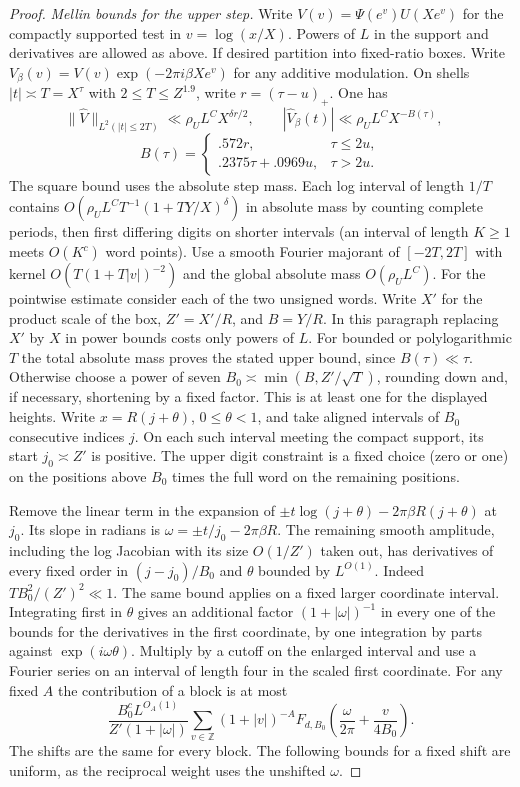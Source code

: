 \documentclass[11pt,a4paper]{article}
\theoremstyle{paperplain}
\numberwithin{equation}{section}
\begin{document}
\begin{proof}
\par\smallskip\noindent\textit{Mellin bounds for the upper step.}  Write \(V(v)=\Psi(e^v)U(Xe^v)\)
for the compactly supported test in \(v=\log(x/X)\). Powers of \(L\) in the support and
derivatives are allowed as above. If desired partition into fixed-ratio boxes. Write
\(V_\beta(v)=V(v)\exp(-2\pi i\beta Xe^v)\) for any additive modulation. On shells \(|t|\asymp
T=X^\tau\) with \(2\le T\le Z^{1.9}\), write \(r=(\tau-u)_+\). One has
\[
 \|\widehat V\|_{L^2(|t|\le2T)}\ll\rho_U L^C X^{\delta r/2},\qquad
 |\widehat V_\beta(t)|\ll \rho_U L^C X^{-B(\tau)},\quad\]
\[
 B(\tau)=\begin{cases}.572r,&\tau\le2u,\\.2375\tau+.0969u,&\tau>2u.\end{cases}
\]
The square bound uses the absolute step mass. Each log interval of length \(1/T\) contains
\(O(\rho_U L^C T^{-1}(1+TY/X)^\delta)\) in absolute mass by counting complete periods, then first
differing digits on shorter intervals (an interval of length \(K\ge1\) meets \(O(K^c)\) word
points). Use a smooth Fourier majorant of \([-2T,2T]\) with kernel \(O(T(1+T|v|)^{-2})\) and the
global absolute mass \(O(\rho_U L^C)\). For the pointwise estimate consider each of the two unsigned words.
Write $X'$ for the product scale of the box, $Z'=X'/R$, and $B=Y/R$.
In this paragraph replacing $X'$ by $X$ in power bounds costs only
powers of $L$. For bounded or polylogarithmic $T$ the total absolute
mass proves the stated upper bound, since $B(\tau)\ll\tau$.
Otherwise choose a power of seven $B_0\asymp\min(B,Z'/\sqrt T)$,
rounding down and, if necessary, shortening by a fixed factor.
This is at least one for the displayed heights. Write $x=R(j+\theta)$,
$0\le\theta<1$, and take aligned intervals of $B_0$ consecutive
indices $j$. On each such interval meeting the compact support,
its start $j_0\asymp Z'$ is positive. The upper digit constraint is
a fixed choice (zero or one) on the positions above $B_0$ times the
full word on the remaining positions.

Remove the linear term in the expansion of
$\pm t\log (j+\theta)-2\pi\beta R(j+\theta)$ at $j_0$.
Its slope in radians is $\omega=\pm t/j_0-2\pi\beta R$.
The remaining smooth amplitude, including the log Jacobian
with its size $O(1/Z')$ taken out, has derivatives of every fixed
order in $(j-j_0)/B_0$ and $\theta$ bounded by $L^{O(1)}$.
Indeed $T B_0^2/(Z')^2\ll1$. The same bound applies on a fixed
larger coordinate interval. Integrating first in $\theta$ gives
an additional factor $(1+|\omega|)^{-1}$ in every one of the
bounds for the derivatives in the first coordinate, by one
integration by parts against $\exp(i\omega\theta)$.
Multiply by a cutoff on the enlarged interval and use a Fourier
series on an interval of length four in the scaled first coordinate.
For any fixed $A$ the contribution of a block is at most
\[
 \frac{B_0^c L^{O_A(1)}}{Z'(1+|\omega|)}
  \sum_{v\in\mathbb Z}(1+|v|)^{-A}
 F_{d,B_0}\!\left(\frac{\omega}{2\pi}+\frac{v}{4B_0}\right).
\]
The shifts are the same for every block. The following bounds for
a fixed shift are uniform, as the reciprocal weight uses the
unshifted $\omega$.


\end{proof}
\end{document}
